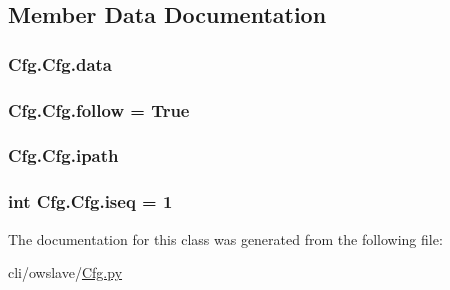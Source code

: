 \subsection{Member Data Documentation}
\hypertarget{classCfg_1_1Cfg_a150a4ddf8a1f91351f7600142fa71a28}{
\subsubsection[{data}]{\setlength{\rightskip}{0pt plus 5cm}Cfg.\-Cfg.\-data}}\label{classCfg_1_1Cfg_a150a4ddf8a1f91351f7600142fa71a28}
\hypertarget{classCfg_1_1Cfg_ac3e9afe1ab5766e019aae9bdbe3ce765}{
\subsubsection[{follow}]{\setlength{\rightskip}{0pt plus 5cm}Cfg.\-Cfg.\-follow = True\hspace{0.3cm}{\ttfamily [static]}}}\label{classCfg_1_1Cfg_ac3e9afe1ab5766e019aae9bdbe3ce765}
\hypertarget{classCfg_1_1Cfg_a8f506e4846d887e584fffb80a3f12e11}{
\subsubsection[{ipath}]{\setlength{\rightskip}{0pt plus 5cm}Cfg.\-Cfg.\-ipath}}\label{classCfg_1_1Cfg_a8f506e4846d887e584fffb80a3f12e11}
\hypertarget{classCfg_1_1Cfg_ab27ccaec7ea2ee59d0f233351389f250}{
\subsubsection[{iseq}]{\setlength{\rightskip}{0pt plus 5cm}int Cfg.\-Cfg.\-iseq = 1\hspace{0.3cm}{\ttfamily [static]}}}\label{classCfg_1_1Cfg_ab27ccaec7ea2ee59d0f233351389f250}


The documentation for this class was generated from the following file\-:\begin{DoxyCompactItemize}
\item 
cli/owslave/\hyperlink{Cfg_8py}{Cfg.\-py}\end{DoxyCompactItemize}
